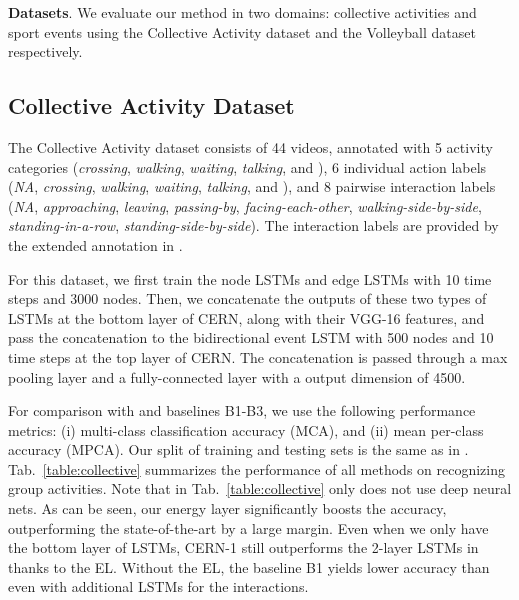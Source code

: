 \documentclass[10pt,twocolumn,letterpaper]{article}
\begin{document}
{\bf Datasets}. We evaluate our method in two domains: collective activities and sport events using the Collective Activity dataset \cite{Choi2009} and the Volleyball dataset \cite{Ibrahim2016} respectively.

\subsection{Collective Activity Dataset}

The Collective Activity dataset consists of 44 videos, annotated with 5 activity categories (\textit{crossing}, \textit{walking}, \textit{waiting}, \textit{talking}, and ), 6 individual action labels (\textit{NA}, \textit{crossing}, \textit{walking}, \textit{waiting}, \textit{talking}, and ), and 8 pairwise interaction labels (\textit{NA}, \textit{approaching}, \textit{leaving}, \textit{passing-by}, \textit{facing-each-other}, \textit{walking-side-by-side}, \textit{standing-in-a-row}, \textit{standing-side-by-side}). The interaction labels are provided by the extended annotation in \cite{Choi2014}. 

For this dataset, we first train the node LSTMs and edge LSTMs with 10 time steps and 3000 nodes. Then, we concatenate the outputs of these two types of LSTMs at the bottom layer of CERN, along with their VGG-16 features, and pass the concatenation to the bidirectional event LSTM with 500 nodes and 10 time steps at the top layer of CERN. The concatenation is passed through a max pooling layer and a fully-connected layer with a output dimension of 4500. 

For comparison with \cite{Hajimirsadeghi2015, Ibrahim2016} and baselines B1-B3, we use the following performance metrics: (i) multi-class classification accuracy (MCA), and (ii) mean per-class accuracy (MPCA). Our split of training and testing sets is the same as in \cite{Hajimirsadeghi2015, Ibrahim2016}. Tab.~\ref{table:collective} summarizes the performance of all methods on recognizing group activities. Note that in Tab.~\ref{table:collective}  only \cite{Hajimirsadeghi2015} does not use deep neural nets. As can be seen, our energy layer significantly boosts the accuracy, outperforming the state-of-the-art by a large margin. Even when we only have the bottom layer of LSTMs, CERN-1 still outperforms the 2-layer LSTMs in \cite{Ibrahim2016} thanks to the EL. Without the EL, the baseline B1 yields lower accuracy than \cite{Ibrahim2016} even with additional LSTMs for the interactions.
\end{document}
